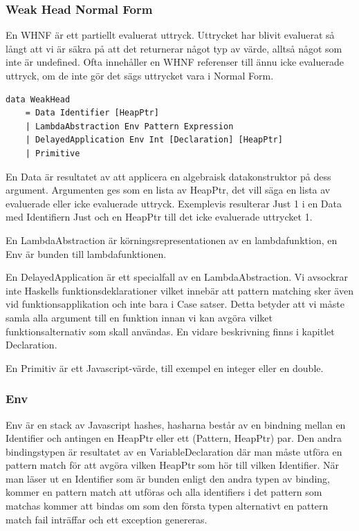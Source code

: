 \subsubsection{Weak Head Normal Form}
En WHNF är ett partiellt evaluerat uttryck. Uttrycket har blivit evaluerat så långt att vi är säkra på att det returnerar något typ av värde, alltså något som inte är undefined. Ofta innehåller en WHNF referenser till ännu icke evaluerade uttryck, om de inte gör det sägs uttrycket vara i Normal Form.

\begin{lstlisting}
data WeakHead 
    = Data Identifier [HeapPtr]
    | LambdaAbstraction Env Pattern Expression
    | DelayedApplication Env Int [Declaration] [HeapPtr]
    | Primitive
\end{lstlisting}

En Data är resultatet av att applicera en algebraisk datakonstruktor på dess argument. Argumenten ges som en lista av HeapPtr, det vill säga en lista av evaluerade eller icke evaluerade uttryck. Exemplevis resulterar Just 1 i en Data med Identifiern Just och en HeapPtr till det icke evaluerade uttrycket 1.

En LambdaAbstraction är körningsrepresentationen av en lambdafunktion, en Env är bunden till lambdafunktionen.

En DelayedApplication är ett specialfall av en LambdaAbstraction. Vi avsockrar inte Haskells funktionsdeklarationer vilket innebär att pattern matching sker även vid funktionsapplikation och inte bara i Case satser. Detta betyder att vi måste samla alla argument till en funktion innan vi kan avgöra vilket funktionsalternativ som skall användas. En vidare beskrivning finns i kapitlet Declaration.

En Primitiv är ett Javascript-värde, till exempel en integer eller en double.

\subsubsection{Env}
Env är en stack av Javascript hashes, hasharna består av en bindning mellan en Identifier och antingen en HeapPtr eller ett (Pattern, HeapPtr) par.  Den andra bindingstypen är resultatet av en VariableDeclaration där man måste utföra en pattern match för att avgöra vilken HeapPtr som hör till vilken Identifier. När man läser ut en Identifier som är bunden enligt den andra typen av binding,  kommer en pattern match att utföras och alla identifiers i det pattern som matchas kommer att bindas om som den första typen alternativt en pattern match fail inträffar och ett exception genereras.

